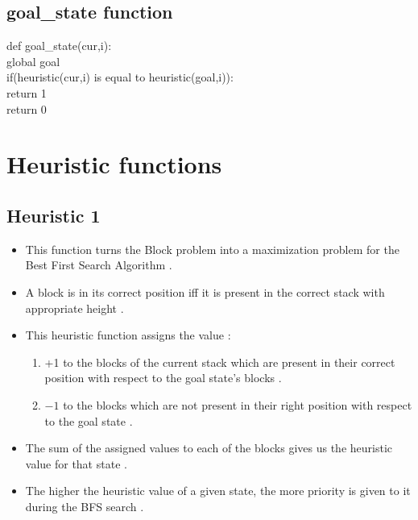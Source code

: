 \documentclass{article}
\begin{document}
\subsection*{goal\_state function}
    \vspace{5pt}
    def goal\_state(cur,i):
        \vspace{5pt}
        \\ \hspace*{20pt}global goal
        \vspace{5pt}
        \\ \hspace*{20pt}if(heuristic(cur,i) is equal to heuristic(goal,i)):
        \vspace{5pt}
        \\ \hspace*{30pt} return 1
        \vspace{5pt}
        \\ \hspace*{20pt} return 0
\newpage
\section{Heuristic functions}
\subsection{Heuristic 1}
\begin{itemize}
    \item This function turns the Block problem into a maximization problem for the Best First Search Algorithm .
    \item A block is in its correct position iff it is present in the correct stack with appropriate height .  
    \item This heuristic function assigns the value :
    \begin{enumerate}
        \item+1 to the blocks of the current stack which
        are present in their correct position with respect to the goal state's blocks .
        \item$-1$ to the blocks which are not present in their right position
        with respect to the goal state .
    \end{enumerate}
    \item The sum of the assigned values to each of the blocks gives us the heuristic value for that state .
    \item The higher the heuristic value of a given state, the more priority is given to it during the BFS search .
\end{itemize}
\end{document}
